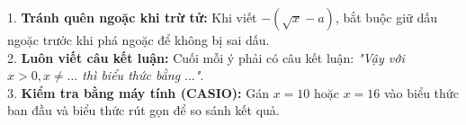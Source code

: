\documentclass[12pt,a4paper]{article}
\begin{document}
\vspace{1mm}
\noindent
\begin{tcolorbox}[colback=yellow!10,colframe=orange!80!black,title=\textbf{3 LƯU Ý SƯ PHẠM QUAN TRỌNG ĐỂ HỌC SINH ĐẠT ĐIỂM TỐI ĐA (2,5 ĐIỂM)},arc=1.2mm,boxrule=0.6pt,top=0.8mm,bottom=0.8mm]
\small
1. \textbf{Tránh quên ngoặc khi trừ tử:} Khi viết $-(\sqrt{x}-a)$, bắt buộc giữ dấu ngoặc trước khi phá ngoặc để không bị sai dấu.\\
2. \textbf{Luôn viết câu kết luận:} Cuối mỗi ý phải có câu kết luận: \textit{"Vậy với $x > 0, x \ne \dots$ thì biểu thức bằng $\dots$"}.\\
3. \textbf{Kiểm tra bằng máy tính (CASIO):} Gán $x = 10$ hoặc $x = 16$ vào biểu thức ban đầu và biểu thức rút gọn để so sánh kết quả.
\end{tcolorbox}
\end{document}
